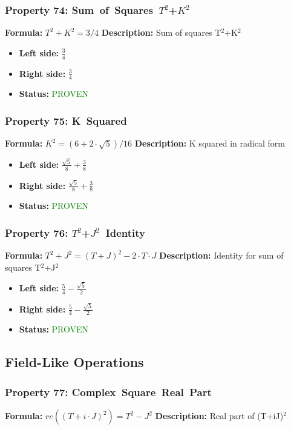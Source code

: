 \subsubsection*{Property 74: Sum~of~Squares~$T^{2}$+$K^{2}$}
\textbf{Formula:} $T^2 + K^2 = 3/4$
\textbf{Description:} Sum of squares T$^2$+K$^2$

\begin{itemize}
\item \textbf{Left side:} $\frac{3}{4}$
\item \textbf{Right side:} $\frac{3}{4}$
\item \textbf{Status:} \textcolor{green}{PROVEN}
\end{itemize}

\subsubsection*{Property 75: K~Squared}
\textbf{Formula:} $K^2 = (6 + 2 \cdot \sqrt{5})/16$
\textbf{Description:} K squared in radical form

\begin{itemize}
\item \textbf{Left side:} $\frac{\sqrt{5}}{8} + \frac{3}{8}$
\item \textbf{Right side:} $\frac{\sqrt{5}}{8} + \frac{3}{8}$
\item \textbf{Status:} \textcolor{green}{PROVEN}
\end{itemize}

\subsubsection*{Property 76: $T^{2}$+$J^{2}$~Identity}
\textbf{Formula:} $T^2 + J^2 = (T+J)^2 - 2 \cdot T \cdot J$
\textbf{Description:} Identity for sum of squares T$^2$+J$^2$

\begin{itemize}
\item \textbf{Left side:} $\frac{5}{4} - \frac{\sqrt{5}}{2}$
\item \textbf{Right side:} $\frac{5}{4} - \frac{\sqrt{5}}{2}$
\item \textbf{Status:} \textcolor{green}{PROVEN}
\end{itemize}


\subsection{Field-Like Operations}

\subsubsection*{Property 77: Complex~Square~Real~Part}
\textbf{Formula:} $re((T+i \cdot J)^2) = T^2-J^2$
\textbf{Description:} Real part of (T+iJ)$^2$

